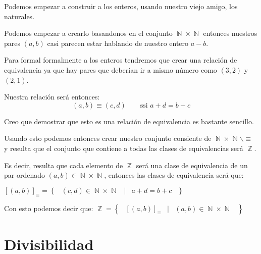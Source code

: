 \documentclass[12pt, fleqn]{report}                             %
\DeclareMathOperator \Space {\quad}                             %
\DeclareMathOperator \MiniSpace {\;}                            %
\newcommand \Such {\MiniSpace|\MiniSpace}                       %
\newcommand{\Set}[1]{\left\{ \MiniSpace #1 \MiniSpace \right\}} %
\DeclareMathOperator \Naturals  {\mathbb{N}}                     %
\DeclareMathOperator \Integers  {\mathbb{Z}}                     %
\begin{document}
        Podemos empezar a construir a los enteros, usando nuestro viejo amigo, los 
        naturales.

        Podemos empezar a crearlo basandonos en el conjunto $\Naturals \times \Naturals$
        entonces nuestros pares $(a, b)$ casi parecen estar hablando de nuestro entero 
        $a-b$.

        Para formal formalmente a los enteros tendremos que crear una relación de equivalencia
        ya que hay pares que deberían ir a mismo número como $(3,2)$ y $(2,1)$.

        Nuestra relación será entonces:
        \begin{equation}
            (a,b) \equiv (c,d) \Space \text{ ssi } a + d = b + c
        \end{equation}

        Creo que demostrar que esto es una relación de equivalencia es bastante sencillo.

        Usando esto podemos entonces crear nuestro conjunto consiente de
        $\Naturals \times \Naturals \backslash \equiv$ y resulta que el conjunto que contiene
        a todas las clases de equivalencias será $\Integers$.

        Es decir, resulta que cada elemento de $\Integers$ será una clase de equivalencia
        de un par ordenado $(a,b) \in \Naturals \times \Naturals$, entonces
        las clases de equivalencia será que:

        $[(a,b)]_{\equiv} = \Set{(c,d) \in \Naturals \times \Naturals \Such a+d=b+c}$

        Con esto podemos decir que:
        $\Integers = \Set{ [(a,b)]_{\equiv} \Such (a,b) \in \Naturals \times \Naturals}$




\chapter{Divisibilidad}
    \clearpage

     

    \clearpage
\end{document}
